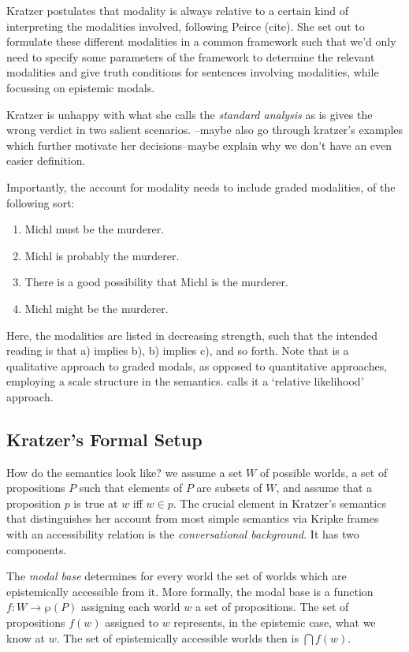 \documentclass{article}
\begin{document}
Kratzer postulates that modality is always relative to a certain kind of interpreting the modalities involved, following Peirce (cite).
She set out to formulate these different modalities in a common framework such that we'd only need to specify some parameters of the framework to determine the relevant modalities and give truth conditions for sentences involving modalities, while focussing on epistemic modals.

Kratzer is unhappy with what she calls the \emph{standard analysis} as is gives the wrong verdict in two salient scenarios.
--maybe also go through kratzer's examples which further motivate her decisions--maybe explain why we don't have an even easier definition.

Importantly, the account for modality needs to include graded modalities, of the following sort:
\begin{enumerate}[nosep,label=\alph*)]
  \item Michl must be the murderer.
  \item Michl is probably the murderer.
  \item There is a good possibility that Michl is the murderer.
  \item Michl might be the murderer.
\end{enumerate}
Here, the modalities are listed in decreasing strength, such that the intended reading is that a) implies b), b) implies c), and so forth. Note that is a qualitative approach to graded modals, as opposed to quantitative approaches, employing a scale structure in the semantics.
\textcite{yalcin10_probab_operat} calls it a `relative likelihood' approach.

\subsection{Kratzer's Formal Setup}
How do the semantics look like?
we assume a set $W$ of possible worlds, a set of propositions $P$ such that elements of $P$ are subsets of $W$, and assume that a proposition $p$ is true at $w$ iff $w \in p$.
The crucial element in Kratzer's semantics that distinguishes her account from most simple semantics via Kripke frames with an accessibility relation is the \emph{conversational background}.
It has two components.

The \emph{modal base} determines for every world the set of worlds which are epistemically accessible from it.
More formally, the modal base is a function $f: W \rightarrow \wp(P)$ assigning each world $w$ a set of propositions.
The set of propositions $f(w)$ assigned to $w$ represents, in the epistemic case, what we know at $w$.
The set of epistemically accessible worlds then is $\bigcap f(w)$.
\end{document}
